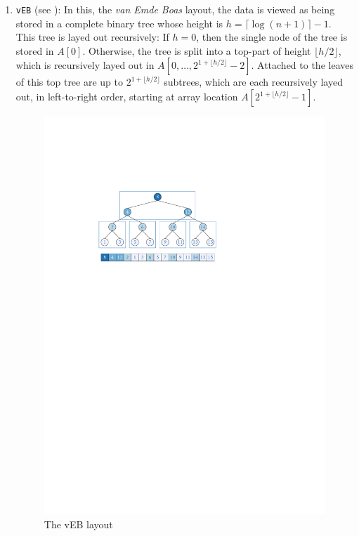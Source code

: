 \documentclass{patmorin}
\begin{document}
\begin{enumerate}

  \item \texttt{vEB} (see ): In this, the \emph{van Emde
  Boas} layout, the data is viewed as being stored in a complete binary
  tree whose height is $h=\lceil\log (n+1)\rceil -1$. This tree is
  layed out recursively:  If $h=0$, then the single node of the tree
  is stored in $A[0]$.  Otherwise, the tree is split into a top-part
  of height $\lfloor h/2\rfloor$, which is recursively layed out in
  $A[0,\ldots,2^{1+\lfloor{h/2\rfloor}}-2]$.  Attached to the leaves of
  this top tree are up to $2^{1+\lfloor{h/2\rfloor}}$ subtrees, which
  are each recursively layed out, in left-to-right order, starting at
  array location $A[2^{1+\lfloor{h/2\rfloor}}-1]$.

  \begin{figure}
    \begin{center}\includegraphics{veb}\end{center}
    \caption{The vEB layout}
  \end{figure}


\end{enumerate}
\end{document}
